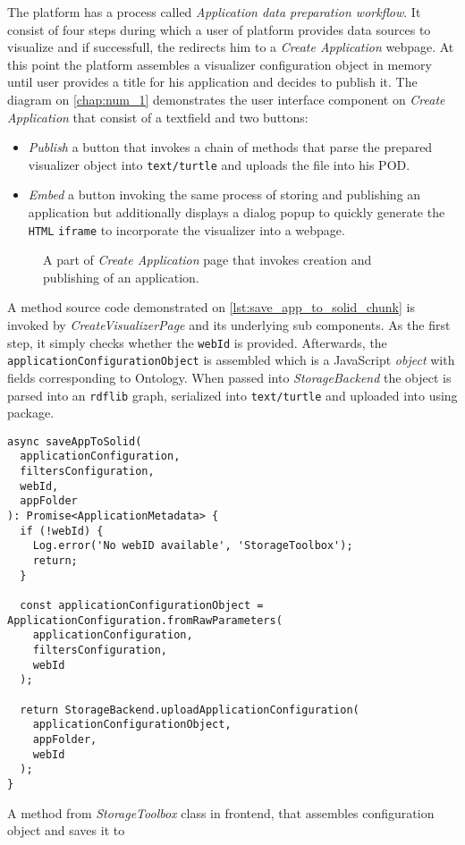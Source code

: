 The \lpa{} platform has a process called \textit{Application data preparation workflow}. It consist of four steps during which a user of platform provides data sources to visualize and if successfull, the \lpa{} redirects him to a \textit{Create Application} webpage. At this point the platform assembles a visualizer configuration object in memory until user provides a title for his application and decides to publish it. The diagram on \autoref{chap:num_1} demonstrates the user interface component on \textit{Create Application} that consist of a textfield and two buttons:
\begin{itemize}
	\item \textit{Publish} a button that invokes a chain of methods that parse the prepared visualizer object into \texttt{text/turtle} and uploads the file into his \solid{} POD.
	\item \textit{Embed} a button invoking the same process of storing and publishing an application but additionally displays a dialog popup to quickly generate the \texttt{HTML} \texttt{iframe} to incorporate the visualizer into a webpage.
\end{itemize}

\begin{figure}[h]
\centering
{}
\caption{A part of \textit{Create Application} page that invokes creation and publishing of an application.}
\label{fig:storage_dashboard_implementation_diagram}
\end{figure}

A method source code demonstrated on \autoref{lst:save_app_to_solid_chunk} is invoked by \textit{CreateVisualizerPage} and its underlying sub components. As the first step, it simply checks whether the \texttt{webId} is provided. Afterwards, the \texttt{applicationConfigurationObject} is assembled which is a JavaScript \textit{object} with fields corresponding to \lpas{} Ontology. When passed into \textit{StorageBackend} the object is parsed into an \texttt{rdflib} graph, serialized into \texttt{text/turtle} and uploaded into \solid{} using \lpas{} package.

\begin{listing}[H]    
\begin{verbatim}
async saveAppToSolid(
  applicationConfiguration,
  filtersConfiguration,
  webId,
  appFolder
): Promise<ApplicationMetadata> {
  if (!webId) {
    Log.error('No webID available', 'StorageToolbox');
    return;
  }

  const applicationConfigurationObject = ApplicationConfiguration.fromRawParameters(
    applicationConfiguration,
    filtersConfiguration,
    webId
  );

  return StorageBackend.uploadApplicationConfiguration(
    applicationConfigurationObject,
    appFolder,
    webId
  );
}
\end{verbatim}
\caption{A method from \textit{StorageToolbox} class in\lpa{} frontend, that assembles configuration object and saves it to \solid{}} 
\label{lst:save_app_to_solid_chunk}
\end{listing}

